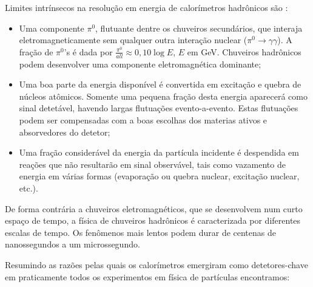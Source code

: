 Limites intrínsecos na resolução em energia de calorímetros hadrônicos são
\cite{hadcal}:

\begin{itemize}
  \item Uma componente $\pi^{0}$, flutuante dentre os chuveiros secundários, que
  interaja eletromagneticamente sem qualquer outra interação nuclear ($\pi^{0}
  \rightarrow \gamma\gamma$). A fração de $\pi^{0}$'s é dada por
  $\frac{\pi^{0}}{all} \approx 0,10 \log{E}$, $E$ em GeV. Chuveiros hadrônicos
  podem desenvolver uma componente eletromagnética dominante;

\item Uma boa parte da energia disponível é convertida em excitação e quebra
  de núcleos atômicos. Somente uma pequena fração desta energia aparecerá como
  sinal detetável, havendo largas flutuações evento-a-evento. Estas flutuações
  podem ser compensadas com a boas escolhas dos materias ativos e absorvedores
  do detetor;

\item Uma fração considerável da energia da partícula incidente é despendida
  em reações que não resultarão em sinal observável, tais como vazamento de
  energia em várias formas (evaporação ou quebra nuclear, excitação nuclear,
  etc.).
\end{itemize}

De forma contrária a chuveiros eletromagnéticos, que se desenvolvem num curto
espaço de tempo, a física de chuveiros hadrônicos é caracterizada por
diferentes escalas de tempo. Os fenômenos mais lentos podem durar de centenas
de nanossegundos a um microssegundo.

Resumindo as razões pelas quais os calorímetros emergiram como detetores-chave
em praticamente todos os experimentos em física de partículas encontramos:

